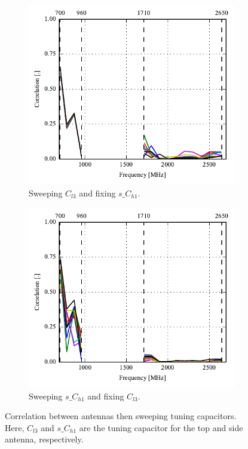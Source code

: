 \begin{figure}[htbp]
    \centering
    \begin{subfigure}{0.49\linewidth}
        \includegraphics{img/tech_sol/nonresonant/simulation/freespace/sweep_top_corr}
        \caption{Sweeping $C_{l3}$ and fixing $s\_C_{h1}$.}
    \end{subfigure}
    \hfill
    \begin{subfigure}{0.49\linewidth}
        \includegraphics{img/tech_sol/nonresonant/simulation/freespace/sweep_side_corr}
        \caption{Sweeping $s\_C_{h1}$ and fixing $C_{l3}$.}
    \end{subfigure}
    \caption{Correlation between antennas then sweeping tuning capacitors. Here, $C_{l3}$ and $s\_C_{h1}$ are the tuning capacitor for the top and side antenna, respectively.}
    \label{fig:corr_sol3}
\end{figure}

